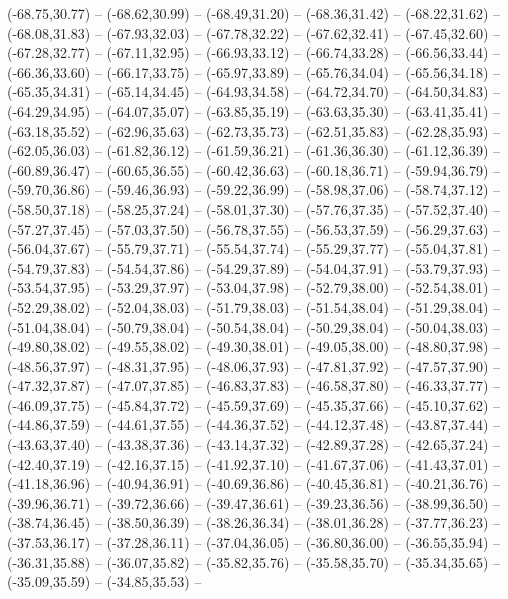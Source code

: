 {  (-68.75,30.77) -- (-68.62,30.99) -- (-68.49,31.20) -- (-68.36,31.42) -- (-68.22,31.62) -- (-68.08,31.83) -- (-67.93,32.03) --
  (-67.78,32.22) -- (-67.62,32.41) -- (-67.45,32.60) -- (-67.28,32.77) -- (-67.11,32.95) -- (-66.93,33.12) -- (-66.74,33.28) --
  (-66.56,33.44) -- (-66.36,33.60) -- (-66.17,33.75) -- (-65.97,33.89) -- (-65.76,34.04) -- (-65.56,34.18) -- (-65.35,34.31) --
  (-65.14,34.45) -- (-64.93,34.58) -- (-64.72,34.70) -- (-64.50,34.83) -- (-64.29,34.95) -- (-64.07,35.07) -- (-63.85,35.19) --
  (-63.63,35.30) -- (-63.41,35.41) -- (-63.18,35.52) -- (-62.96,35.63) -- (-62.73,35.73) -- (-62.51,35.83) -- (-62.28,35.93) --
  (-62.05,36.03) -- (-61.82,36.12) -- (-61.59,36.21) -- (-61.36,36.30) -- (-61.12,36.39) -- (-60.89,36.47) -- (-60.65,36.55) --
  (-60.42,36.63) -- (-60.18,36.71) -- (-59.94,36.79) -- (-59.70,36.86) -- (-59.46,36.93) -- (-59.22,36.99) -- (-58.98,37.06) --
  (-58.74,37.12) -- (-58.50,37.18) -- (-58.25,37.24) -- (-58.01,37.30) -- (-57.76,37.35) -- (-57.52,37.40) -- (-57.27,37.45) --
  (-57.03,37.50) -- (-56.78,37.55) -- (-56.53,37.59) -- (-56.29,37.63) -- (-56.04,37.67) -- (-55.79,37.71) -- (-55.54,37.74) --
  (-55.29,37.77) -- (-55.04,37.81) -- (-54.79,37.83) -- (-54.54,37.86) -- (-54.29,37.89) -- (-54.04,37.91) -- (-53.79,37.93) --
  (-53.54,37.95) -- (-53.29,37.97) -- (-53.04,37.98) -- (-52.79,38.00) -- (-52.54,38.01) -- (-52.29,38.02) -- (-52.04,38.03) --
  (-51.79,38.03) -- (-51.54,38.04) -- (-51.29,38.04) -- (-51.04,38.04) -- (-50.79,38.04) -- (-50.54,38.04) -- (-50.29,38.04) --
  (-50.04,38.03) -- (-49.80,38.02) -- (-49.55,38.02) -- (-49.30,38.01) -- (-49.05,38.00) -- (-48.80,37.98) -- (-48.56,37.97) --
  (-48.31,37.95) -- (-48.06,37.93) -- (-47.81,37.92) -- (-47.57,37.90) -- (-47.32,37.87) -- (-47.07,37.85) -- (-46.83,37.83) --
  (-46.58,37.80) -- (-46.33,37.77) -- (-46.09,37.75) -- (-45.84,37.72) -- (-45.59,37.69) -- (-45.35,37.66) -- (-45.10,37.62) --
  (-44.86,37.59) -- (-44.61,37.55) -- (-44.36,37.52) -- (-44.12,37.48) -- (-43.87,37.44) -- (-43.63,37.40) -- (-43.38,37.36) --
  (-43.14,37.32) -- (-42.89,37.28) -- (-42.65,37.24) -- (-42.40,37.19) -- (-42.16,37.15) -- (-41.92,37.10) -- (-41.67,37.06) --
  (-41.43,37.01) -- (-41.18,36.96) -- (-40.94,36.91) -- (-40.69,36.86) -- (-40.45,36.81) -- (-40.21,36.76) -- (-39.96,36.71) --
  (-39.72,36.66) -- (-39.47,36.61) -- (-39.23,36.56) -- (-38.99,36.50) -- (-38.74,36.45) -- (-38.50,36.39) -- (-38.26,36.34) --
  (-38.01,36.28) -- (-37.77,36.23) -- (-37.53,36.17) -- (-37.28,36.11) -- (-37.04,36.05) -- (-36.80,36.00) -- (-36.55,35.94) --
  (-36.31,35.88) -- (-36.07,35.82) -- (-35.82,35.76) -- (-35.58,35.70) -- (-35.34,35.65) -- (-35.09,35.59) -- (-34.85,35.53) --
}
